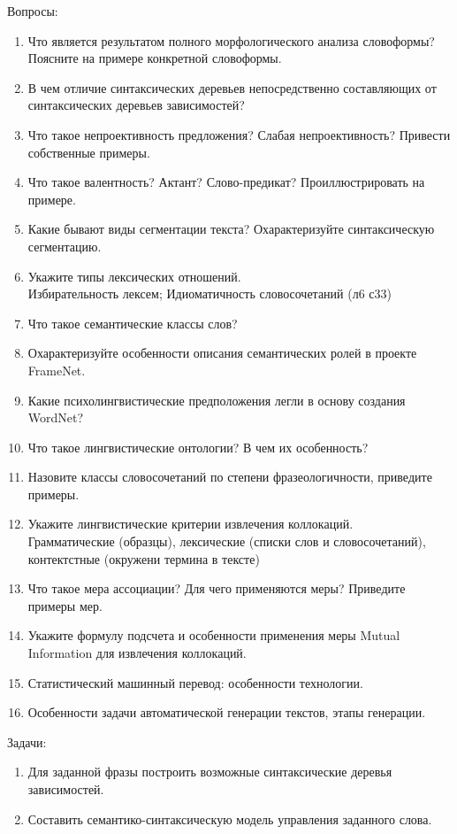 \documentclass[a4paper]{article}
\begin{document}
Вопросы:
\begin{enumerate}
	\item Что является результатом полного морфологического анализа словоформы? Поясните на примере конкретной словоформы.
	\item В чем отличие синтаксических деревьев непосредственно составляющих от синтаксических деревьев зависимостей?
	\item Что такое непроективность предложения? Слабая непроективность? Привести собственные примеры.
	\item Что такое валентность? Актант? Слово-предикат? Проиллюстрировать на примере.
	\item Какие бывают виды сегментации текста? Охарактеризуйте синтаксическую сегментацию.
	\item Укажите типы лексических отношений.\hfill\\
	Избирательность лексем; Идиоматичность словосочетаний (л6 с33)

	\item Что такое семантические классы слов?\hfill\\

	\item Охарактеризуйте особенности описания семантических ролей в проекте FrameNet.\hfill\\
	\item Какие психолингвистические предположения легли в основу создания WordNet?\hfill\\

	\item Что такое лингвистические онтологии? В чем их особенность?\hfill\\
	\item Назовите классы словосочетаний по степени фразеологичности, приведите примеры.\hfill\\

	\item Укажите лингвистические критерии извлечения коллокаций.\hfill\\
	Грамматические (образцы), лексические (списки слов и словосочетаний), контектстные (окружени термина в тексте)

	\item Что такое мера ассоциации? Для чего применяются меры? Приведите примеры мер.

	\item Укажите формулу подсчета и особенности применения меры Mutual Information для извлечения коллокаций.

	\item Статистический машинный перевод: особенности технологии.\hfill\\

	\item Особенности задачи автоматической генерации текстов, этапы генерации.\hfill\\
\end{enumerate}

Задачи:
\begin{enumerate}
	\item Для заданной фразы построить возможные синтаксические деревья зависимостей.
	\item Составить семантико-синтаксическую модель управления заданного слова.
\end{enumerate}



\end{document}

